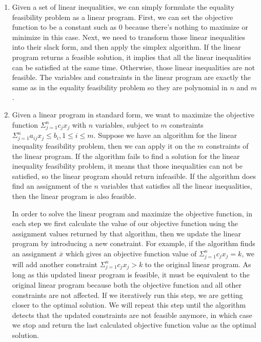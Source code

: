 \documentclass[11pt]{article}
\begin{document}
    \solution
    \begin{enumerate}[leftmargin=*, topsep=0pt]
      \item Given a set of linear inequalities, we can simply formulate the equality feasibility problem as a linear program. First, we can set the objective function to be a constant such as 0 because there's nothing to maximize or minimize in this case. Next, we need to transform those linear inequalities into their slack form, and then apply the simplex algorithm. If the linear program returns a feasible solution, it implies that all the linear inequalities can be satisfied at the same time. Otherwise, those linear inequalities are not feasible. The variables and constraints in the linear program are exactly the same as in the equality feasibility problem so they are polynomial in $n$ and $m$.

      \item Given a linear program in standard form, we want to maximize the objective function $\Sigma_{j=1}^{n} c_jx_j$ with $n$ variables, subject to $m$ constraints $\Sigma_{j=1}^{n} a_{ij}x_j \leq b_i, 1 \leq i \leq m$. Suppose we have an algorithm for the linear inequality feasibility problem, then we can apply it on the $m$ constraints of the linear program. If the algorithm fails to find a solution for the linear inequality feasibility problem, it means that those inequalities can not be satisfied, so the linear program should return infeasible. If the algorithm does find an assignment of the $n$ variables that satisfies all the linear inequalities, then the linear program is also feasible.

      In order to solve the linear program and maximize the objective function, in each step we first calculate the value of our objective function using the assignment values returned by that algorithm, then we update the linear program by introducing a new constraint. For example, if the algorithm finds an assignment $\overline{x}$ which gives an objective function value of $\Sigma_{j=1}^{n} c_jx_j = k$, we will add another constraint $\Sigma_{j=1}^{n} c_jx_j > k$ to the original linear program. As long as this updated linear program is feasible, it must be equivalent to the original linear program because both the objective function and all other constraints are not affected. If we iteratively run this step, we are getting closer to the optimal solution. We will repeat this step until the algorithm detects that the updated constraints are not feasible anymore, in which case we stop and return the last calculated objective function value as the optimal solution.


\end{enumerate}
\end{document}

